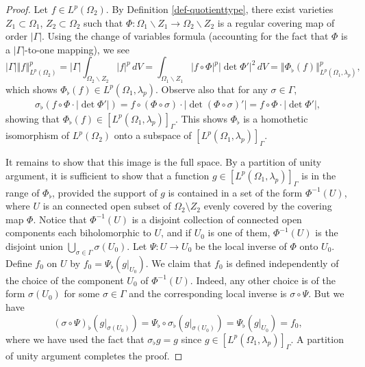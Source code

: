 \documentclass[letterpaper,11pt,reqno]{amsart}
\theoremstyle{plain}
\theoremstyle{definition}
\theoremstyle{remark}
\theoremstyle{remark}
\numberwithin{equation}{section}
\newcommand{\abs}[1]{\left\vert#1\right\vert}
\newcommand{\norm}[1]{\left\Vert#1\right\Vert}
\begin{document}
\begin{proof}
Let $f \in L^p(\Omega_2)$.  By Definition \ref{def-quotienttype}, there exist varieties $Z_1 \subset\Omega_1$, $Z_2\subset\Omega_2$ such that $\Phi: \Omega_1\backslash Z_1 \to \Omega_2\backslash Z_2$ is a regular covering map of order $|\Gamma|$.  
Using the change of variables formula (accounting for the fact that $\Phi$ is a $\abs{\Gamma}$-to-one mapping), we see
\begin{equation}\label{E:Phi_flat-norm-equivalence}
    |\Gamma| \norm{f}^p_{L^p(\Omega_2)} = |\Gamma| \int_{\Omega_2\backslash Z_2} |f|^p\, dV = \int_{\Omega_1\backslash Z_1} |f \circ \Phi|^p |\det \Phi'|^2 \, dV = \norm{\Phi_\flat(f)}^p_{L^p(\Omega_1, \lambda_p)},
\end{equation}
which shows $\Phi_\flat(f) \in L^p(\Omega_1,\lambda_p)$.  Observe also that for any $\sigma \in \Gamma$,
\begin{align*}
\sigma_\flat(f \circ \Phi \cdot |\det \Phi'|)  
= f \circ (\Phi \circ \sigma) \cdot |\det (\Phi \circ \sigma)'|
= f \circ \Phi \cdot |\det \Phi'|,
\end{align*}
showing that $\Phi_\flat(f) \in \left[L^p(\Omega_1,\lambda_p)\right]_\Gamma$.  This shows $\Phi_\flat$ is a homothetic isomorphism of $L^p(\Omega_2)$ onto a subspace of $\left[ L^p(\Omega_1 ,\lambda_p) \right]_\Gamma$.  

It remains to show that this image is the full space. 
By a partition of unity argument, it is sufficient to show that a function $g\in \left[L^p(\Omega_1,\lambda_p)\right]_\Gamma$ is in the range of $\Phi_\flat$, provided the support of $g$ is contained in a set of the form $\Phi^{-1}(U)$, where $U$ is an connected open subset of $\Omega_2\setminus Z_2$ evenly covered by the covering map $\Phi$.
Notice that $\Phi^{-1}(U)$ is a disjoint collection of connected open components each biholomorphic to $U$, and if $U_0$ is one of them, $\Phi^{-1}(U)$ is the disjoint union $\bigcup_{\sigma\in \Gamma} \sigma(U_0)$. 
Let $\Psi:U\to U_0$ be the local inverse of $\Phi$ onto $U_0$.
Define $f_0$ on $U$ by $f_0 = \Psi_\flat\left( g|_{U_0}\right)$.
We claim that $f_0$ is defined independently of the choice of the component $U_0$ of $\Phi^{-1}(U)$. Indeed, any other choice is of the form $\sigma(U_0)$ for some $\sigma\in \Gamma$  and the
corresponding local inverse is $\sigma\circ \Psi$. But we have
\[
(\sigma\circ \Psi)_\flat \left( g|_{\sigma(U_0)}\right) = \Psi_\flat \circ \sigma_\flat \left( g|_{\sigma(U_0)}\right)
= \Psi_\flat \left( g|_{U_0}\right)  =f_0,
\]
where we have used the fact that $ \sigma_\flat g=g$ since $g\in \left[ L^p(\Omega_1,\lambda_p)\right ]_\Gamma$. A partition of unity argument completes the proof. 
\end{proof}
\end{document}
